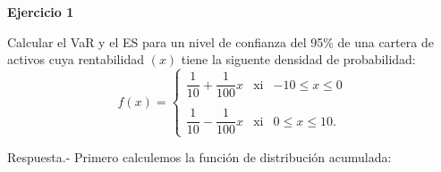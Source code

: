 \begin{center}
    \textbf{\large Ejercicio 1}
\end{center}

Calcular el VaR y el ES para un nivel de confianza del 95\% de una cartera de activos cuya rentabilidad $(x)$ tiene la siguente densidad de probabilidad:
$$
f(x) = \left\{
    \begin{array}{rcl}
	\dfrac{1}{10}+\dfrac{1}{100}x &\mbox{xi}& -10\leq x \leq 0\\\\
	\dfrac{1}{10}-\dfrac{1}{100}x &\mbox{xi}& 0\leq x \leq 10.
    \end{array}
	\right.
$$
\vspace{.5cm}

Respuesta.-\; Primero calculemos la función de distribución acumulada:
